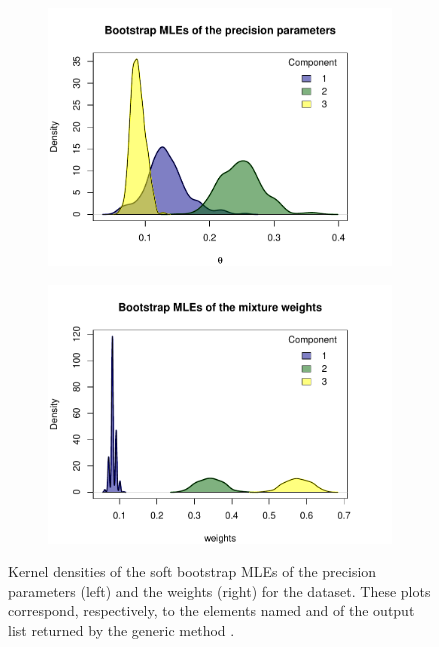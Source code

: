 \begin{figure}[t]
     \centering
     \begin{subfigure}[b]{0.49\textwidth}
         \centering
         \includegraphics[width=\textwidth]{figures/RJ2025_paper_boot1.pdf}
     \end{subfigure}
     \begin{subfigure}[b]{0.49\textwidth}
         \centering
         \includegraphics[width=\textwidth]{figures/RJ2025_paper_boot2.pdf}
      \end{subfigure}

        \caption{Kernel densities of the soft bootstrap MLEs of the precision parameters (left) and the weights (right) for the  dataset. These plots correspond, respectively, to the elements named  and  of the output list returned by the generic method .}
        \label{fig:boot_theta_weights}
\end{figure}



